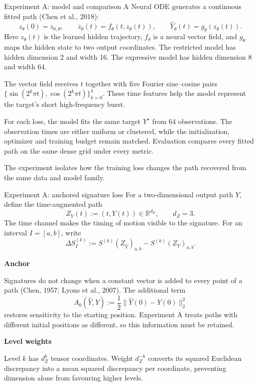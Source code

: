\documentclass[aspectratio=169,9pt]{beamer}
\begin{document}
\begin{frame}{Experiment A: model and comparison}
  A Neural ODE generates a continuous fitted path (Chen et al., 2018):
  \[
    z_\theta(0)=z_{0,\theta},
    \qquad
    \dot z_\theta(t)=f_\theta\!\left(t,z_\theta(t)\right),
    \qquad
    \widehat Y_\theta(t)=g_\theta\!\left(z_\theta(t)\right).
  \]
  Here $z_\theta(t)$ is the learned hidden trajectory, $f_\theta$ is a neural vector field, and $g_\theta$ maps the hidden state to two output coordinates. The restricted model has hidden dimension 2 and width 16. The expressive model has hidden dimension 8 and width 64.

  The vector field receives $t$ together with five Fourier sine--cosine pairs $\{\sin(2^k\pi t),\cos(2^k\pi t)\}_{k=0}^{4}$. These time features help the model represent the target's short high-frequency burst.

  For each loss, the model fits the same target $Y^\star$ from 64 observations. The observation times are either uniform or clustered, while the initialization, optimizer and training budget remain matched. Evaluation compares every fitted path on the same dense grid under every metric.

  The experiment isolates how the training loss changes the path recovered from the same data and model family.
\end{frame}

\begin{frame}{Experiment A: anchored signature loss}
  For a two-dimensional output path $Y$, define the time-augmented path
  \[
    Z_Y(t):=(t,Y(t))\in\mathbb R^{d_Z},
    \qquad d_Z=3.
  \]
  The time channel makes the timing of motion visible to the signature. For an interval $I=[a,b]$, write
  \[
    \Delta S_I^{(k)}
    :=S^{(k)}(Z_{\widehat Y})_{a,b}-S^{(k)}(Z_Y)_{a,b}.
  \]

  \textbf{Anchor}\par
  Signatures do not change when a constant vector is added to every point of a path (Chen, 1957; Lyons et al., 2007). The additional term
  \[
    A_0(\widehat Y,Y):=\frac12\|\widehat Y(0)-Y(0)\|_2^2
  \]
  restores sensitivity to the starting position. Experiment A treats paths with different initial positions as different, so this information must be retained.

  \textbf{Level weights}\par
  Level $k$ has $d_Z^k$ tensor coordinates. Weight $d_Z^{-k}$ converts its squared Euclidean discrepancy into a mean squared discrepancy per coordinate, preventing dimension alone from favouring higher levels.
\end{frame}
\end{document}
